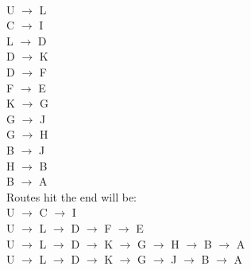 \documentclass{article}
\begin{document}
\begin{enumerate}
\begin{enumerate}
\\ U $\rightarrow$ L
\\ C $\rightarrow$ I
\\ L $\rightarrow$ D
\\ D $\rightarrow$ K
\\ D $\rightarrow$ F
\\ F $\rightarrow$ E
\\ K $\rightarrow$ G
\\ G $\rightarrow$ J
\\ G $\rightarrow$ H
\\ B $\rightarrow$ J
\\ H $\rightarrow$ B
\\ B $\rightarrow$ A
\\ Routes hit the end will be:
\\ U $\rightarrow$ C $\rightarrow$ I
\\ U $\rightarrow$ L $\rightarrow$ D $\rightarrow$ F $\rightarrow$ E
\\ U $\rightarrow$ L $\rightarrow$ D $\rightarrow$ K $\rightarrow$ G $\rightarrow$ H $\rightarrow$ B $\rightarrow$ A
\\ U $\rightarrow$ L $\rightarrow$ D $\rightarrow$ K $\rightarrow$ G $\rightarrow$ J $\rightarrow$ B $\rightarrow$ A


\end{enumerate}
\end{enumerate}
\end{document}
